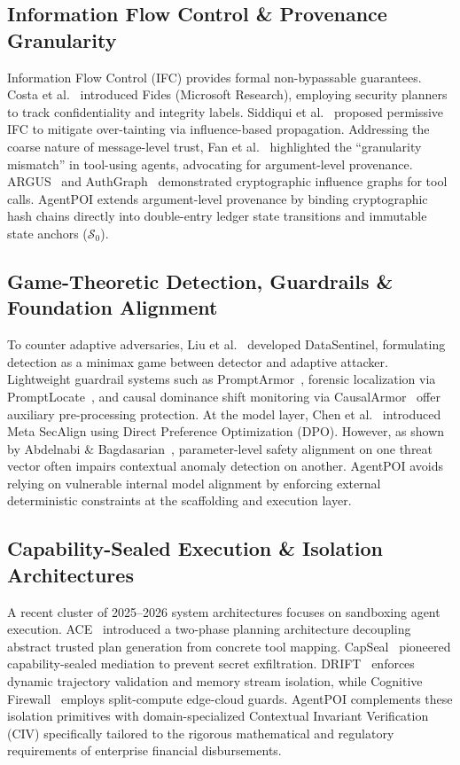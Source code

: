 \subsection{Information Flow Control \& Provenance Granularity}
Information Flow Control (IFC) provides formal non-bypassable guarantees. Costa et al.~\cite{costa2025fides} introduced Fides (Microsoft Research), employing security planners to track confidentiality and integrity labels. Siddiqui et al.~\cite{siddiqui2024permissive} proposed permissive IFC to mitigate over-tainting via influence-based propagation. Addressing the coarse nature of message-level trust, Fan et al.~\cite{fan2026granularity} highlighted the ``granularity mismatch'' in tool-using agents, advocating for argument-level provenance. ARGUS~\cite{argus2026defense} and AuthGraph~\cite{authgraph2026} demonstrated cryptographic influence graphs for tool calls. AgentPOI extends argument-level provenance by binding cryptographic hash chains directly into double-entry ledger state transitions and immutable state anchors ($\mathcal{S}_0$).

\subsection{Game-Theoretic Detection, Guardrails \& Foundation Alignment}
To counter adaptive adversaries, Liu et al.~\cite{datasentinel2025} developed DataSentinel, formulating detection as a minimax game between detector and adaptive attacker. Lightweight guardrail systems such as PromptArmor~\cite{promptarmor2025}, forensic localization via PromptLocate~\cite{promptlocate2026}, and causal dominance shift monitoring via CausalArmor~\cite{causalarmor2026} offer auxiliary pre-processing protection. At the model layer, Chen et al.~\cite{chen2025metasecalign} introduced Meta SecAlign using Direct Preference Optimization (DPO). However, as shown by Abdelnabi \& Bagdasarian~\cite{abdelnabi2026impossibility}, parameter-level safety alignment on one threat vector often impairs contextual anomaly detection on another. AgentPOI avoids relying on vulnerable internal model alignment by enforcing external deterministic constraints at the scaffolding and execution layer.

\subsection{Capability-Sealed Execution \& Isolation Architectures}
A recent cluster of 2025--2026 system architectures focuses on sandboxing agent execution. ACE~\cite{ace2026architecture} introduced a two-phase planning architecture decoupling abstract trusted plan generation from concrete tool mapping. CapSeal~\cite{capseal2026} pioneered capability-sealed mediation to prevent secret exfiltration. DRIFT~\cite{drift2025} enforces dynamic trajectory validation and memory stream isolation, while Cognitive Firewall~\cite{cognitivefirewall2026} employs split-compute edge-cloud guards. AgentPOI complements these isolation primitives with domain-specialized Contextual Invariant Verification (CIV) specifically tailored to the rigorous mathematical and regulatory requirements of enterprise financial disbursements.

